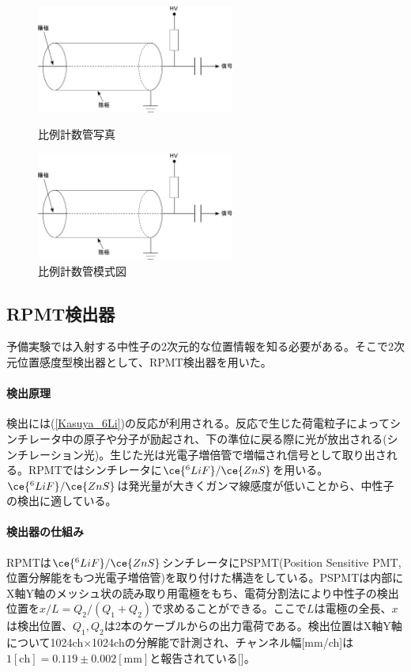 \begin{figure}[h]
\begin{minipage}{0.5\hsize}
\begin{center}
\includegraphics[width=6.5cm]{detector/detector_fig1.pdf}
\caption{比例計数管写真}
\end{center}
\end{minipage}
\begin{minipage}{0.5\hsize}
\begin{center}
\includegraphics[width=6.5cm]{detector/detector_fig1.pdf}
\caption{比例計数管模式図}
\end{center}
\end{minipage}
\end{figure}

\subsection{RPMT検出器}
予備実験では入射する中性子の2次元的な位置情報を知る必要がある。そこで2次元位置感度型検出器として、RPMT検出器を用いた。

\paragraph{検出原理}
検出には(\ref{Kasuya_6Li})の反応が利用される。反応で生じた荷電粒子によってシンチレータ中の原子や分子が励起され、下の準位に戻る際に光が放出される(シンチレーション光)。生じた光は光電子増倍管で増幅され信号として取り出される。RPMTではシンチレータに$\ce{^6LiF}/\ce{ZnS}$を用いる。$\ce{^6LiF}/\ce{ZnS}$は発光量が大きくガンマ線感度が低いことから、中性子の検出に適している。

\paragraph{検出器の仕組み}
RPMTは$\ce{^6LiF}/\ce{ZnS}$シンチレータにPSPMT(Position Sensitive PMT,位置分解能をもつ光電子増倍管)を取り付けた構造をしている。PSPMTは内部にX軸Y軸のメッシュ状の読み取り用電極をもち、電荷分割法により中性子の検出位置を$x/L=Q_2/(Q_1+Q_2)$で求めることができる。ここで$L$は電極の全長、$x$は検出位置、$Q_1,Q_2$は2本のケーブルからの出力電荷である。検出位置はX軸Y軸について1024ch$\times$1024chの分解能で計測され、チャンネル幅[mm/ch]は$1\mathrm{[ch]}=0.119\pm0.002\mathrm{[mm]}$と報告されている[]。


